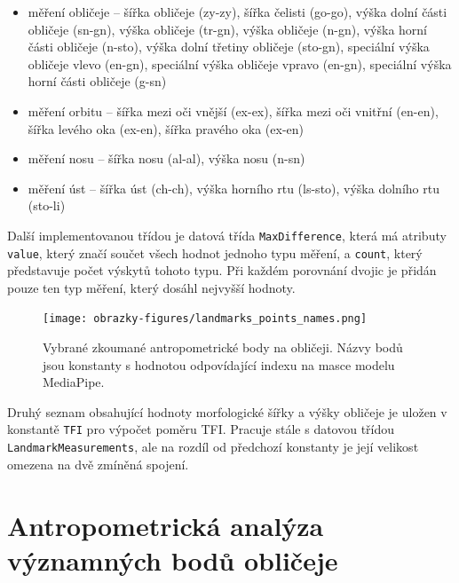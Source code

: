 \begin{itemize}
    \item měření obličeje -- šířka obličeje (zy-zy), šířka čelisti (go-go), výška dolní části obličeje (sn-gn), výška obličeje (tr-gn), výška obličeje (n-gn), výška horní části obličeje (n-sto), výška dolní třetiny obličeje (sto-gn), speciální výška obličeje vlevo (en-gn), speciální výška obličeje vpravo (en-gn), speciální výška horní části obličeje (g-sn)
    \item měření orbitu -- šířka mezi oči vnější (ex-ex), šířka mezi oči vnitřní (en-en), šířka levého oka (ex-en), šířka pravého oka (ex-en)
    \item měření nosu -- šířka nosu (al-al), výška nosu (n-sn)
    \item měření úst -- šířka úst (ch-ch), výška horního rtu (ls-sto), výška dolního rtu (sto-li)
\end{itemize}

\noindent Další implementovanou třídou je datová třída \texttt{MaxDifference}, která má atributy \texttt{value}, který značí součet všech hodnot jednoho typu měření, a \texttt{count}, který představuje počet výskytů tohoto typu. Při každém porovnání dvojic je přidán pouze ten typ měření, který dosáhl nejvyšší hodnoty.

\begin{figure}[H]
	\centering
	\texttt{[image: obrazky-figures/landmarks\_points\_names.png]}
	\caption{Vybrané zkoumané antropometrické body na obličeji. Názvy bodů jsou konstanty s hodnotou odpovídající indexu na masce modelu MediaPipe.}
        \label{fig:draw-face-landmarks}
\end{figure}

\noindent Druhý seznam obsahující hodnoty morfologické šířky a výšky obličeje je uložen v konstantě \texttt{TFI} pro výpočet poměru TFI. Pracuje stále s datovou třídou \texttt{LandmarkMeasurements}, ale na rozdíl od předchozí konstanty je její velikost omezena na dvě zmíněná spojení.


\section{Antropometrická analýza významných bodů obličeje}
\label{MediaPipe-implementation}

